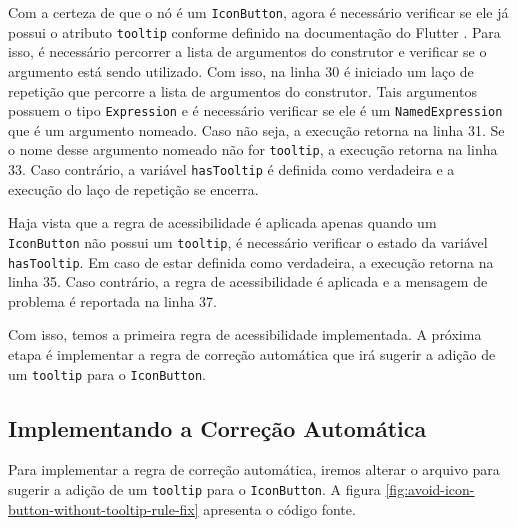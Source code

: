 Com a certeza de que o nó é um \texttt{IconButton}, agora é necessário verificar se ele já possui o atributo \texttt{tooltip} conforme definido na documentação do Flutter \cite{flutter}. Para isso, é necessário percorrer a lista de argumentos do construtor e verificar se o argumento está sendo utilizado. Com isso, na linha 30 é iniciado um laço de repetição que percorre a lista de argumentos do construtor. Tais argumentos possuem o tipo \texttt{Expression} e é necessário verificar se ele é um \texttt{NamedExpression} que é um argumento nomeado. Caso não seja, a execução retorna na linha 31. Se o nome desse argumento nomeado não for \texttt{tooltip}, a execução retorna na linha 33. Caso contrário, a variável \texttt{hasTooltip} é definida como verdadeira e a execução do laço de repetição se encerra.

Haja vista que a regra de acessibilidade é aplicada apenas quando um \texttt{IconButton} não possui um \texttt{tooltip}, é necessário verificar o estado da variável \texttt{hasTooltip}. Em caso de estar definida como verdadeira, a execução retorna na linha 35. Caso contrário, a regra de acessibilidade é aplicada e a mensagem de problema é reportada na linha 37.

Com isso, temos a primeira regra de acessibilidade implementada. A próxima etapa é implementar a regra de correção automática que irá sugerir a adição de um \texttt{tooltip} para o \texttt{IconButton}.

\subsection{Implementando a Correção Automática}

Para implementar a regra de correção automática, iremos alterar o arquivo  para sugerir a adição de um \texttt{tooltip} para o \texttt{IconButton}. A figura \ref{fig:avoid-icon-button-without-tooltip-rule-fix} apresenta o código fonte.

